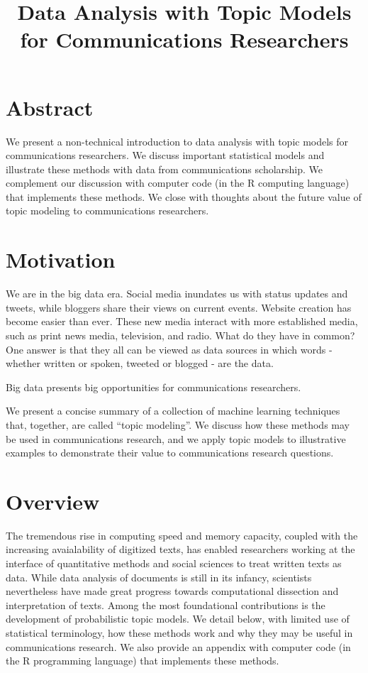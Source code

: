 \documentclass[12pt,]{article}
\title{Data Analysis with Topic Models for Communications Researchers}
\author{}
\date{}
\begin{document}
\maketitle

\section{Abstract}\label{abstract}

We present a non-technical introduction to data analysis with topic
models for communications researchers. We discuss important statistical
models and illustrate these methods with data from communications
scholarship. We complement our discussion with computer code (in the R
computing language) that implements these methods. We close with
thoughts about the future value of topic modeling to communications
researchers.

\section{Motivation}\label{motivation}

We are in the big data era. Social media inundates us with status
updates and tweets, while bloggers share their views on current events.
Website creation has become easier than ever. These new media interact
with more established media, such as print news media, television, and
radio. What do they have in common? One answer is that they all can be
viewed as data sources in which words - whether written or spoken,
tweeted or blogged - are the data.

Big data presents big opportunities for communications researchers.

We present a concise summary of a collection of machine learning
techniques that, together, are called ``topic modeling''. We discuss how
these methods may be used in communications research, and we apply topic
models to illustrative examples to demonstrate their value to
communications research questions.

\section{Overview}\label{overview}

The tremendous rise in computing speed and memory capacity, coupled with
the increasing avaialability of digitized texts, has enabled researchers
working at the interface of quantitative methods and social sciences to
treat written texts as data. While data analysis of documents is still
in its infancy, scientists nevertheless have made great progress towards
computational dissection and interpretation of texts. Among the most
foundational contributions is the development of probabilistic topic
models. We detail below, with limited use of statistical terminology,
how these methods work and why they may be useful in communications
research. We also provide an appendix with computer code (in the R
programming language) that implements these methods.
\end{document}

